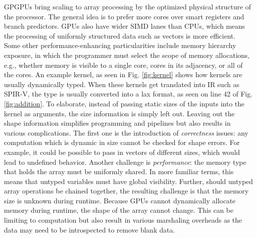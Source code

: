 \documentclass{report}
\begin{document}
GPGPUs bring scaling to array processing by the optimized physical structure of the processor. The general idea is to prefer more cores over smart registers and branch predictors. GPUs also have wider SIMD lanes than CPUs, which means the processing of uniformly structured data such as vectors is more efficient. Some other performance-enhancing particularities include memory hierarchy exposure, in which the programmer must select the scope of memory allocations, e.g., whether memory is visible to a single core, cores in its adjacency, or all of the cores. An example kernel, as seen in Fig. \ref{fig:kernel} shows how kernels are usually dynamically typed. When these kernels get translated into \gls{IR} such as SPIR-V, the type is usually converted into a lax format, as seen on line 42 of Fig. \ref{fig:addition}. To elaborate, instead of passing static sizes of the inputs into the kernel as arguments, the size information is simply left out. Leaving out the shape information simplifies programming and pipelines but also results in various complications. The first one is the introduction of \emph{correctness} issues: any computation which is dynamic in size cannot be checked for shape errors. For example, it could be possible to pass in vectors of different sizes, which would lead to undefined behavior. Another challenge is \emph{performance}: the memory type that holds the array must be uniformly shared. In more familiar terms, this means that untyped variables must have global visibility. Further, should untyped array operations be chained together, the resulting challenge is that the memory size is unknown during runtime. Because GPUs cannot dynamically allocate memory during runtime, the shape of the array cannot change. This can be limiting to computation but also result in various marshaling overheads as the data may need to be introspected to remove blank data.
\end{document}
